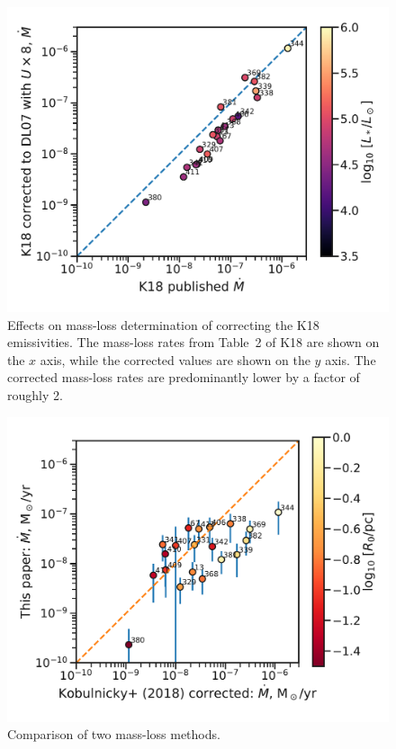 \begin{figure}
  \centering
  \includegraphics[width=\linewidth]{figs/K18-mdot-Ux8-comparison}
  \caption{Effects on mass-loss determination of correcting the K18
    emissivities.  The mass-loss rates from Table~2 of K18 are shown
    on the \(x\) axis, while the corrected values are shown on the
    \(y\) axis.  The corrected mass-loss rates are predominantly lower
    by a factor of roughly 2.}
  \label{fig:k18-mdot-corrected-emissivity}
\end{figure}

\begin{figure}
  \centering
  \includegraphics[width=\linewidth]{figs/K18-mdot-corrected-comparison-R0}
  \caption{Comparison of two mass-loss methods.}
  \label{fig:mass-loss-comparison}
\end{figure}


